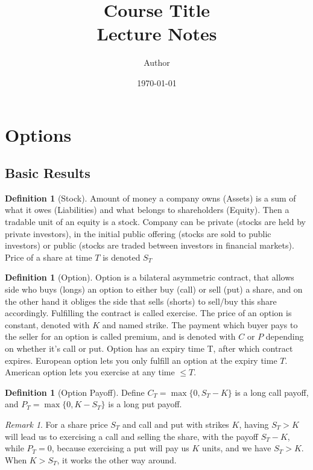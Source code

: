\documentclass[11pt,a4paper]{article}
\title{\textbf{Course Title}\\[4pt]\large Lecture Notes}
\author{Author}
\date{\today}
\theoremstyle{plain}
\theoremstyle{definition}
\newtheorem{definition}[theorem]{Definition}
\theoremstyle{remark}
\newtheorem*{remark}{Remark}
\newcommand{\1}{\mathbf{1}}
\begin{document}
\maketitle
\tableofcontents
\newpage

\section{Options}

\subsection{Basic Results}

\begin{definition}[Stock]\label{def:first}
  Amount of money a company owns (Assets) is a sum of what it owes (Liabilities) and what belongs to shareholders (Equity). Then a tradable unit of an equity is a stock. Company can be private (stocks are held by private investors), in the initial public offering (stocks are sold to public investors) or public (stocks are traded between investors in financial markets). Price of a share at time $T$ is denoted $S_T$
\end{definition}

\begin{definition}[Option]
  Option is a bilateral asymmetric contract, that allows side who buys (longs) an option to either buy (call) or sell (put) a share, and on the other hand it obliges the side that sells (shorts) to sell/buy this share accordingly. Fulfilling the contract is called exercise. The price of an option is constant, denoted with $K$ and named strike. The payment which buyer pays to the seller for an option is called premium, and is denoted with $C$ or $P$ depending on whether it's call or put. Option has an expiry time T, after which contract expires. European option lets you only fulfill an option at the expiry time $T$. American option lets you exercise at any time $\le T$.
\end{definition}

\begin{definition}[Option Payoff]
  Define $C_T=\max\{0,S_T-K\}$ is a long call payoff, and $P_T=\max\{0,K-S_T\}$ is a long put payoff.
\end{definition}

\begin{remark}
  For a share price $S_T$ and call and put with strikes $K$, having $S_T>K$ will lead us to exercising a call and selling the share, with the payoff $S_T-K$, while $P_T=0$, because exercising a put will pay us $K$ units, and we have $S_T>K$. When $K>S_T$, it works the other way around.
\end{remark}
\end{document}
